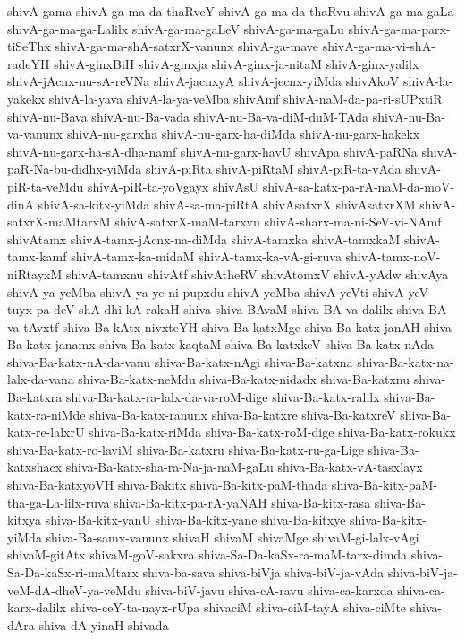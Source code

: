 {shivA-gama
shivA-ga-ma-da-thaRveY
shivA-ga-ma-da-thaRvu
shivA-ga-ma-gaLa
shivA-ga-ma-ga-Lalilx
shivA-ga-ma-gaLeV
shivA-ga-ma-gaLu
shivA-ga-ma-parx-tiSeThx
shivA-ga-ma-shA-satxrX-vanunx
shivA-ga-mave
shivA-ga-ma-vi-shA-radeYH
shivA-ginxBiH
shivA-ginxja
shivA-ginx-ja-nitaM
shivA-ginx-yalilx
shivA-jAcnx-nu-sA-reVNa
shivA-jacnxyA
shivA-jecnx-yiMda
shivAkoV
shivA-la-yakekx
shivA-la-yava
shivA-la-ya-veMba
shivAmf
shivA-naM-da-pa-ri-sUPxtiR
shivA-nu-Bava
shivA-nu-Ba-vada
shivA-nu-Ba-va-diM-duM-TAda
shivA-nu-Ba-va-vanunx
shivA-nu-garxha
shivA-nu-garx-ha-diMda
shivA-nu-garx-hakekx
shivA-nu-garx-ha-sA-dha-namf
shivA-nu-garx-havU
shivApa
shivA-paRNa
shivA-paR-Na-bu-didhx-yiMda
shivA-piRta
shivA-piRtaM
shivA-piR-ta-vAda
shivA-piR-ta-veMdu
shivA-piR-ta-yoVgayx
shivAsU
shivA-sa-katx-pa-rA-naM-da-moV-dinA
shivA-sa-kitx-yiMda
shivA-sa-ma-piRtA
shivAsatxrX
shivAsatxrXM
shivA-satxrX-maMtarxM
shivA-satxrX-maM-tarxvu
shivA-sharx-ma-ni-SeV-vi-NAmf
shivAtamx
shivA-tamx-jAcnx-na-diMda
shivA-tamxka
shivA-tamxkaM
shivA-tamx-kamf
shivA-tamx-ka-midaM
shivA-tamx-ka-vA-gi-ruva
shivA-tamx-noV-niRtayxM
shivA-tamxnu
shivAtf
shivAtheRV
shivAtomxV
shivA-yAdw
shivAya
shivA-ya-yeMba
shivA-ya-ye-ni-pupxdu
shivA-yeMba
shivA-yeVti
shivA-yeV-tuyx-pa-deV-shA-dhi-kA-rakaH
shiva
shiva-BAvaM
shiva-BA-va-dalilx
shiva-BA-va-tAvxtf
shiva-Ba-kAtx-nivxteYH
shiva-Ba-katxMge
shiva-Ba-katx-janAH
shiva-Ba-katx-janamx
shiva-Ba-katx-kaqtaM
shiva-Ba-katxkeV
shiva-Ba-katx-nAda
shiva-Ba-katx-nA-da-vanu
shiva-Ba-katx-nAgi
shiva-Ba-katxna
shiva-Ba-katx-na-lalx-da-vana
shiva-Ba-katx-neMdu
shiva-Ba-katx-nidadx
shiva-Ba-katxnu
shiva-Ba-katxra
shiva-Ba-katx-ra-lalx-da-va-roM-dige
shiva-Ba-katx-ralilx
shiva-Ba-katx-ra-niMde
shiva-Ba-katx-ranunx
shiva-Ba-katxre
shiva-Ba-katxreV
shiva-Ba-katx-re-lalxrU
shiva-Ba-katx-riMda
shiva-Ba-katx-roM-dige
shiva-Ba-katx-rokukx
shiva-Ba-katx-ro-laviM
shiva-Ba-katxru
shiva-Ba-katx-ru-ga-Lige
shiva-Ba-katxshacx
shiva-Ba-katx-sha-ra-Na-ja-naM-gaLu
shiva-Ba-katx-vA-tasxlayx
shiva-Ba-katxyoVH
shiva-Bakitx
shiva-Ba-kitx-paM-thada
shiva-Ba-kitx-paM-tha-ga-La-lilx-ruva
shiva-Ba-kitx-pa-rA-yaNAH
shiva-Ba-kitx-rasa
shiva-Ba-kitxya
shiva-Ba-kitx-yanU
shiva-Ba-kitx-yane
shiva-Ba-kitxye
shiva-Ba-kitx-yiMda
shiva-Ba-samx-vanunx
shivaH
shivaM
shivaMge
shivaM-gi-lalx-vAgi
shivaM-gitAtx
shivaM-goV-sakxra
shiva-Sa-Da-kaSx-ra-maM-tarx-dimda
shiva-Sa-Da-kaSx-ri-maMtarx
shiva-ba-sava
shiva-biVja
shiva-biV-ja-vAda
shiva-biV-ja-veM-dA-dheV-ya-veMdu
shiva-biV-javu
shiva-cA-ravu
shiva-ca-karxda
shiva-ca-karx-dalilx
shiva-ceY-ta-nayx-rUpa
shivaciM
shiva-ciM-tayA
shiva-ciMte
shiva-dAra
shiva-dA-yinaH
shivada
}

